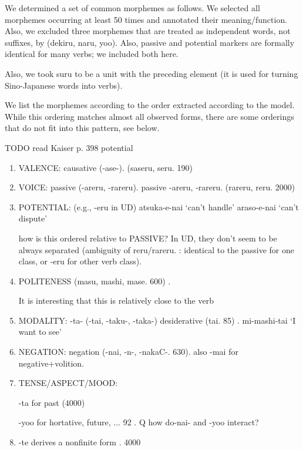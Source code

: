 We determined a set of common morphemes as follows.
We selected all morphemes occurring at least 50 times and annotated their meaning/function.
Also, we excluded three morphemes that are treated as independent words, not suffixes, by \cite{kaiser2013japanese} (dekiru, naru, yoo).
Also, passive and potential markers are formally identical for many verbs; we included both here.

Also, we took suru to be a unit with the preceding element (it is used for turning Sino-Japanese words into verbs).

We list the morphemes according to the order extracted according to the model.
While this ordering matches almost all observed forms, there are some orderings that do not fit into this pattern, see below.



TODO read Kaiser p. 398 potential

\begin{enumerate}
\item VALENCE: causative (-ase-). \cite[142]{hasegawa2014japanese} \cite[Chapter 13]{kaiser2013japanese} (saseru, seru. 190)
\item VOICE: passive (-areru, -rareru). passive \cite[152]{hasegawa2014japanese} \cite[Chapter 12]{kaiser2013japanese} -areru, -rareru. (rareru, reru. 2000)
\item POTENTIAL: (e.g., -eru in UD)  atsuka-e-nai `can't handle' %
araso-e-nai `can't dispute' %

how is this ordered relative to PASSIVE? In UD, they don't seem to be always separated (ambiguity of reru/rareru. \cite[346]{vaccari1938complete}: identical to the passive for one class, or -eru for other verb class).
\item POLITENESS (masu, mashi, mase. 600) \cite[190]{kaiser2013japanese}. %

It is interesting that this is relatively close to the verb

\item MODALITY: -ta- (-tai, -taku-, -taka-) desiderative (tai. 85) \cite[238]{kaiser2013japanese}. mi-mashi-tai `I want to see'
\item NEGATION: negation (-nai, -n-, -nakaC-. 630). also -mai for negative+volition.
\item TENSE/ASPECT/MOOD:

-ta for past (4000)

-yoo for hortative, future, ... 92 \cite[229]{kaiser2013japanese}. Q how do-nai- and -yoo interact?
\item -te derives a nonfinite form \cite[186]{kaiser2013japanese}. 4000
\end{enumerate}

